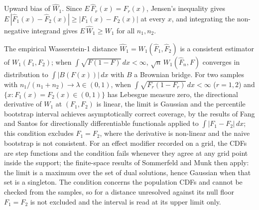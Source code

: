 \documentclass[AMA,Times1COL]{WileyNJDv5}
\begin{document}

Upward bias of $\widehat{W}_1$. Since $E\,\hat{F}_r(x) = F_r(x)$, Jensen's inequality gives $E\,|\hat{F}_1(x) - \hat{F}_2(x)| \geq |F_1(x) - F_2(x)|$ at every $x$, and integrating the non-negative integrand gives $E\,\widehat{W}_1 \geq W_1$ for all $n_1, n_2$.

The empirical Wasserstein-1 distance $\widehat{W}_1 = W_1(\hat{F}_1, \hat{F}_2)$ is a consistent estimator of $W_1(F_1, F_2)$; when $\int \sqrt{F(1-F)}\,dx < \infty$, $\sqrt{n}\,W_1(\hat{F}_n, F)$ converges in distribution to $\int |B(F(x))|\,dx$ with $B$ a Brownian bridge.\cite{delbarrio1999} For two samples with $n_1/(n_1+n_2) \to \lambda \in (0,1)$, when $\int \sqrt{F_r(1-F_r)}\,dx < \infty$ ($r = 1, 2$) and $\{x : F_1(x) = F_2(x) \in (0,1)\}$ has Lebesgue measure zero, the directional derivative of $W_1$ at $(F_1, F_2)$ is linear, the limit is Gaussian and the percentile bootstrap interval achieves asymptotically correct coverage, by the results of Fang and Santos for directionally differentiable functionals applied to $\int |F_1 - F_2|\,dx$;\cite{fang2019} this condition excludes $F_1 = F_2$, where the derivative is non-linear and the naive bootstrap is not consistent.\cite{dumbgen1993,fang2019} For an effect modifier recorded on a grid, the CDFs are step functions and the condition fails whenever they agree at any grid point inside the support; the finite-space results of Sommerfeld and Munk then apply:\cite{sommerfeld2018} the limit is a maximum over the set of dual solutions, hence Gaussian when that set is a singleton. The condition concerns the population CDFs and cannot be checked from the samples, so for a distance unresolved against its null floor $F_1 = F_2$ is not excluded and the interval is read at its upper limit only.

\end{document}
